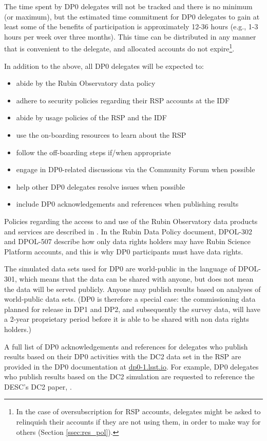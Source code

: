 \documentclass[DM,lsstdraft,authoryear,toc]{lsstdoc}
\begin{document}
The time spent by DP0 delegates will not be tracked and there is no minimum (or maximum), but the estimated time commitment for DP0 delegates to gain at least some of the benefits of participation is approximately 12-36 hours (e.g., 1-3 hours per week over three months).
This time can be distributed in any manner that is convenient to the delegate, and allocated accounts do not expire\footnote{In the case of oversubscription for RSP accounts, delegates might be asked to relinquish their accounts if they are not using them, in order to make way for others (Section \ref{ssec:res_pol}).}.

In addition to the above, all DP0 delegates will be expected to:
\begin{itemize}
\item abide by the Rubin Observatory data policy 
\item adhere to security policies regarding their RSP accounts at the IDF
\item abide by usage policies of the RSP and the IDF
\item use the on-boarding resources to learn about the RSP
\item follow the off-boarding steps if/when appropriate
\item engage in DP0-related discussions via the Community Forum when possible
\item help other DP0 delegates resolve issues when possible
\item include DP0 acknowledgements and references when publishing results
\end{itemize}

Policies regarding the access to and use of the Rubin Observatory data products and services are described in .
In the Rubin Data Policy document, DPOL-302 and DPOL-507 describe how only data rights holders may have Rubin Science Platform accounts, and this is why DP0 participants must have data rights.

The simulated data sets used for DP0 are world-public in the language of DPOL-301, which means that the data can be shared with anyone, but does not mean the data will be served publicly.
Anyone may publish results based on analyses of world-public data sets.
(DP0 is therefore a special case: the commissioning data planned for release in DP1 and DP2, and subsequently the survey data, will have a 2-year proprietary period before it is able to be shared with non data rights holders.)

A full list of DP0 acknowledgements and references for delegates who publish results based on their DP0 activities with the DC2 data set in the RSP are provided in the DP0 documentation at \url{dp0-1.lsst.io}. 
For example, DP0 delegates who publish results based on the DC2 simulation are requested to reference the DESC's DC2 paper, \citet{2020arXiv201005926L}.
\end{document}
